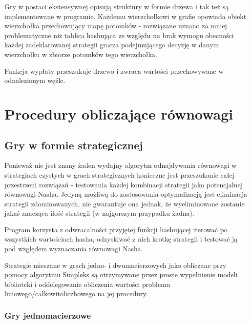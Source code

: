 \documentclass[polish]{standalone}
\begin{document}
Gry w postaci ekstensywnej opisują struktury w formie drzewa i tak też są implementowane w programie. Każdemu 
wierzchołkowi w grafie opowiada obiekt wierzchołka przechowujący mapę potomków - rozwiązane uznano za mniej
problematyczne niż tablica hashująca ze względu na brak wymogu obecności każdej zadeklarowanej strategii gracza
podejmującego decyzję w danym wierzchołku w zbiorze potomków tego wierzchołka.

Funkcja wypłaty przeszukuje drzewo i zwraca wartości przechowywane w odnalezionym węźle.

\section{Procedury obliczające równowagi}

\subsection{Gry w formie strategicznej}

Ponieważ nie jest znany żaden wydajny algorytm odnajdywania równowagi w strategiach czystych w grach strategicznych
konieczne jest przeszukanie całej przestrzeni rozwiązań - testowania każdej kombinacji strategii jako potencjalnej
równowagi Nasha. Jedyną możliwą do zastosowania optymalizacją jest eliminacja strategii zdominowanych, nie gwarantuje
ona jednak, że wyeliminowane zostanie jakaś znacząca ilość strategii (w najgorszym przypadku żadna).

Program korzysta z odwracalności przyjętej funkcji hashującej iterować po wszystkich wartościach hasha, odzyskiwać
z nich krotkę strategii i testować ją pod względem wyznaczania równowagi Nasha.

Strategie mieszane w grach jedno- i dwumacierzowych jako obliczane przy pomocy algorytmu Simpleks są otrzymywane przez
proste wypełnienie modeli biblioteki  i oddelegowanie obliczenia wartości problemu
liniowego/całkowitoliczbowego na jej procedury.

\subsubsection{Gry jednomacierzowe}
\end{document}
